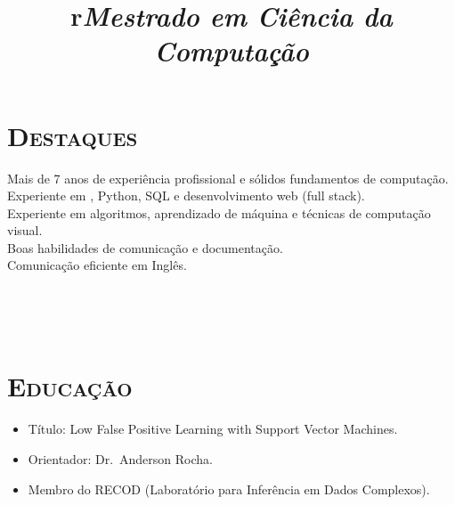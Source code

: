 \begin{resume}

\vspace{-0.2in}


\section{\textsc{Destaques}}

Mais de 7 anos de experi\^encia profissional e s\'olidos fundamentos de computa\c{c}\~ao.\vspace{0.4em}\\
Experiente em \Cplusplus, Python, SQL e desenvolvimento web (full stack).\vspace{0.4em}\\
Experiente em algoritmos, aprendizado de m\'aquina e t\'ecnicas de computa\c{c}\~ao visual.\vspace{0.4em}\\
Boas habilidades de comunica\c{c}\~ao e documenta\c{c}\~ao.\vspace{0.4em}\\
Comunica\c{c}\~ao eficiente em Ingl\^es.


\begin{formatb}
  \\
  \title{r}\\
\end{formatb}

\section{\textsc{Educa\c{c}\~ao}}

\title{\emph{Mestrado em Ci\^encia da Computa\c{c}\~ao}}
\begin{position}
\vspace{1mm}
\begin{itemize}\small
\item T\'itulo: Low False Positive Learning with Support Vector Machines.
\item Orientador: Dr.\ Anderson Rocha.
\item Membro do RECOD (Laborat\'orio para Infer\^encia em Dados Complexos).
\end{itemize}
\end{position}


\end{resume}
